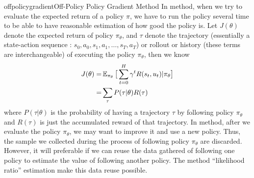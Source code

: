 \documentclass[9pt]{article}
\begin{document}
\begin{topic}{offpolicygradient}{Off-Policy Policy Gradient Method}
In  method, when we try to evaluate the expected return of a policy $\pi$, we have to run the policy several time to be able to have reasonable estimation of how good the policy is. Let $J(\theta)$ denote the expected return of policy $\pi_{\theta}$, and $\tau$ denote the trajectory (essentially a state-action sequence : $s_0, a_0, s_1, a_1, \ldots, s_T, a_T$) or rollout or history (these terms are interchangeable) of executing the policy $\pi_{\theta}$, then we know
\[
\begin{split}
J(\theta) = & \operatorname{\mathbb{E}}_{\pi_{\theta}}\big[\sum_{t=0}^{H}\gamma^tR(s_t,u_t)|\pi_{\theta}\big]\\
= & \sum_{\tau}P(\tau|\theta)R(\tau)
\end{split}
\]
where $P(\tau|\theta)$ is the probability of having a trajectory $\tau$ by following policy $\pi_{\theta}$ and $R(\tau)$ is just the accumulated reward of that trajectory. 
In  method, after we evaluate the policy $\pi_{\theta}$, we may want to improve it and use a new policy. Thus, the sample we collected during the process of following policy $\pi_{\theta}$ are discarded. However, it will preferable if we can reuse the data gathered of following one policy to estimate the value of following another policy. The method ``likelihood ratio'' estimation make this data reuse possible.


\end{topic}
\end{document}
